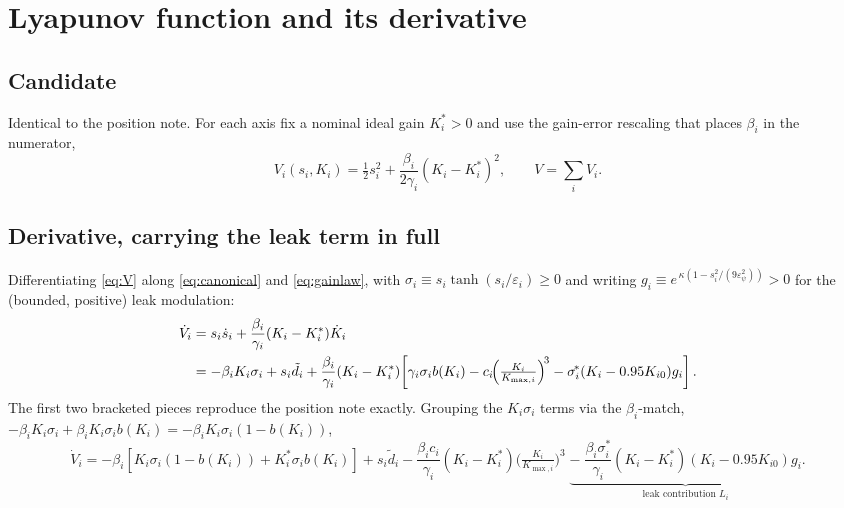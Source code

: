 \documentclass[11pt]{article}
\theoremstyle{plain}
\theoremstyle{definition}
\newcommand{\Tr}[1]{\tanh\!\left(#1\right)}
\begin{document}
\section{Lyapunov function and its derivative}
\label{sec:lyap}

\subsection{Candidate}
Identical to the position note. For each axis fix a nominal ideal gain
$K_i^*>0$ and use the gain-error rescaling that places $\beta_i$ in the numerator,
\begin{equation}
V_i(s_i,K_i)=\tfrac12 s_i^2+\frac{\beta_i}{2\gamma_i}(K_i-K_i^*)^2,
\qquad
V=\sum_i V_i.
\label{eq:V}
\end{equation}

\subsection{Derivative, carrying the leak term in full}
Differentiating \eqref{eq:V} along \eqref{eq:canonical} and \eqref{eq:gainlaw}, with
$\sigma_i\equiv s_i\Tr{s_i/\varepsilon_i}\ge0$ and writing
$g_i\equiv e^{\,\kappa(1-s_i^2/(9\varepsilon_\psi^2))}>0$ for the (bounded, positive)
leak modulation:
\begin{align}
\dot V_i
&= s_i\dot s_i+\frac{\beta_i}{\gamma_i}(K_i-K_i^*)\dot K_i\notag\\
&= -\beta_i K_i\sigma_i+s_i\tilde d_i
+\frac{\beta_i}{\gamma_i}(K_i-K_i^*)\!
\left[\gamma_i\sigma_i b(K_i)-c_i\!\Big(\tfrac{K_i}{K_{\max,i}}\Big)^{\!3}
-\sigma^{\!*}_i(K_i-0.95K_{i0})g_i\right].
\label{eq:Vdot_raw}
\end{align}
The first two bracketed pieces reproduce the position note exactly. Grouping the
$K_i\sigma_i$ terms via the $\beta_i$-match,
$-\beta_iK_i\sigma_i+\beta_iK_i\sigma_i b(K_i)=-\beta_iK_i\sigma_i(1-b(K_i))$,
\begin{equation}
\dot V_i=
-\beta_i\!\left[K_i\sigma_i(1-b(K_i))+K_i^*\sigma_i b(K_i)\right]
+s_i\tilde d_i
-\frac{\beta_i c_i}{\gamma_i}(K_i-K_i^*)\Big(\tfrac{K_i}{K_{\max,i}}\Big)^{\!3}
\;\underbrace{-\;\frac{\beta_i\sigma^{\!*}_i}{\gamma_i}(K_i-K_i^*)(K_i-0.95K_{i0})g_i}_{\text{leak contribution }L_i}.
\label{eq:Vdot}
\end{equation}
\end{document}
